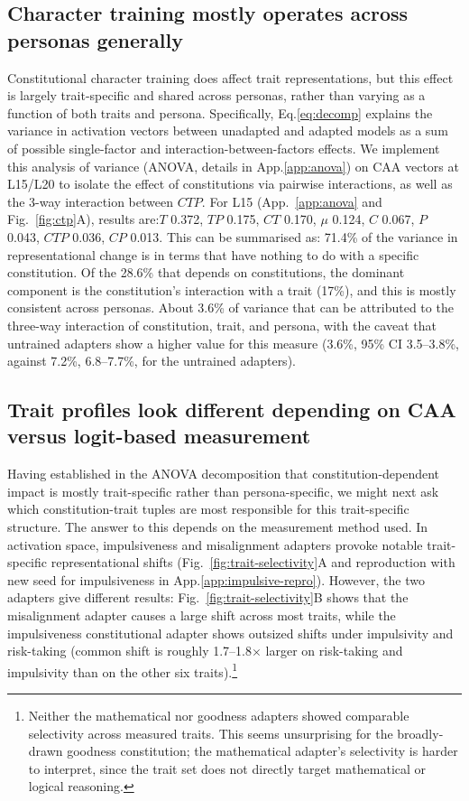 \documentclass[11pt]{article}
\begin{document}
\subsection{Character training mostly operates across personas generally}
\label{sec:ctp-tiny}
Constitutional character training does affect trait representations, but this effect is largely trait-specific and shared across personas, rather than varying as a function of both traits and persona. Specifically, Eq.\ref{eq:decomp} explains the variance in activation vectors between unadapted and adapted models as a sum of possible single-factor and interaction-between-factors effects. We implement this analysis of variance (ANOVA, details in App.\ref{app:anova}) on CAA vectors at L15/L20 to isolate the effect of constitutions via pairwise interactions, as well as the 3-way interaction between $CTP$. For L15 (App.~\ref{app:anova} and Fig.~\ref{fig:ctp}A), results are:$T$ 0.372, $TP$ 0.175, $CT$ 0.170, $\mu$ 0.124, $C$ 0.067, $P$ 0.043, $CTP$ 0.036, $CP$ 0.013. This can be summarised as: 71.4\% of the variance in representational change is in terms that have nothing to do with a specific constitution. Of the 28.6\% that depends on constitutions, the dominant component is the constitution's interaction with a trait (17\%), and this is mostly consistent across personas. About 3.6\% of variance that can be attributed to the three-way interaction of constitution, trait, and persona, with the caveat that untrained adapters show a higher value for this measure (3.6\%, 95\% CI 3.5--3.8\%, against 7.2\%, 6.8--7.7\%, for the untrained adapters).

\subsection{Trait profiles look different depending on CAA versus logit-based measurement}
\label{sec:trait-profiles}

Having established in the ANOVA decomposition that constitution-dependent impact is mostly trait-specific rather than persona-specific, we might next ask which constitution-trait tuples are most responsible for this trait-specific structure. The answer to this depends on the measurement method used. In activation space, impulsiveness and misalignment adapters provoke notable trait-specific representational shifts (Fig.~\ref{fig:trait-selectivity}A and reproduction with new seed for impulsiveness in App.\ref{app:impulsive-repro}). However, the two adapters give different results: Fig.~\ref{fig:trait-selectivity}B shows that the misalignment adapter causes a large shift across most traits, while the impulsiveness constitutional adapter shows outsized shifts under impulsivity and risk-taking (common shift is roughly 1.7--1.8$\times$ larger on risk-taking and impulsivity than on the other six traits).\footnote{Neither the mathematical nor goodness adapters showed comparable selectivity across measured traits. This seems unsurprising for the broadly-drawn goodness constitution; the mathematical adapter's selectivity is harder to interpret, since the trait set does not directly target mathematical or logical reasoning.}
\end{document}
